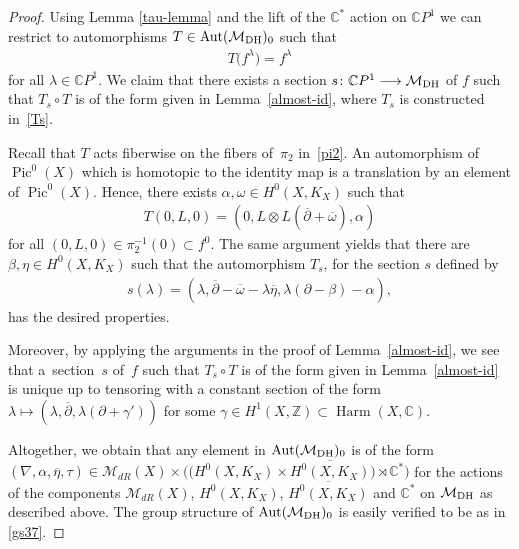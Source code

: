 \begin{proof} Using Lemma \ref{tau-lemma} and the lift of the $\mathbb C^*$ action on $\mathbb C P^1$ we can restrict to automorphisms $T\in \operatorname{Aut}(\mathcal M_{\rm DH})_0$ such that
\begin{gather*}T\big(f^\lambda\big) = f^\lambda\end{gather*} for all $\lambda\in\mathbb CP^1$. We claim that there exists a section $s \colon {\mathbb C}P^1 \longrightarrow {\mathcal M}_{\rm DH}$ of $f$ such that $T_s\circ T$ is of the form given in Lemma~\ref{almost-id}, where $T_s$ is constructed in~\eqref{Ts}.

Recall that $T$ acts f\/iberwise on the f\/ibers of~$\pi_2$ in~\eqref{pi2}. An automorphism of $\operatorname{Pic}^0(X)$ which is homotopic to the identity map is a translation by an element of $\operatorname{Pic}^0(X)$. Hence, there exists $\alpha, \omega \in H^0(X, K_X)$ such that
\begin{gather*}T(0, L, 0) = (0, L\otimes L(\overline{\partial}+\overline{\omega}), \alpha)\end{gather*}
for all $(0, L, 0) \in \pi_2^{-1}(0) \subset f^0$. The same argument yields that there are $\beta, \eta \in H^0(X, K_X)$ such that the automorphism $T_s$, for the section $s$ def\/ined by
\begin{gather*}s(\lambda) = (\lambda, \overline{\partial} -\overline{\omega}-\lambda\overline{\eta}, \lambda(\partial-\beta)-\alpha) ,\end{gather*}
has the desired properties.

Moreover, by applying the arguments in the proof of Lemma~\ref{almost-id}, we see that a~section~$s$ of~$f$ such that $T_s\circ T$ is of the form given in Lemma~\ref{almost-id} is unique up to tensoring with a constant section of the form $\lambda \longmapsto (\lambda, \overline{\partial}, \lambda(\partial+\gamma'))$ for some $\gamma \in H^1(X, \mathbb Z) \subset \operatorname{Harm}(X, \mathbb C)$.

Altogether, we obtain that any element in $\operatorname{Aut}({\mathcal M}_{\rm DH})_0$ is of the form $(\nabla, \alpha, \overline{\eta}, \tau)\in\mathcal M_{dR}(X)\times \big(\big(H^0(X, K_X)\times\overline{H^0(X, K_X)}\big)\rtimes {\mathbb C}^*\big)$ for the actions of the components $\mathcal M_{dR}(X)$, $H^0(X, K_X)$, $\overline{H^0(X, K_X)}$ and ${\mathbb C}^*$ on ${\mathcal M}_{\rm DH}$ as described above. The group structure of $\operatorname{Aut}({\mathcal M}_{\rm DH})_0$ is easily verif\/ied to be as in \eqref{gs37}.
\end{proof}
